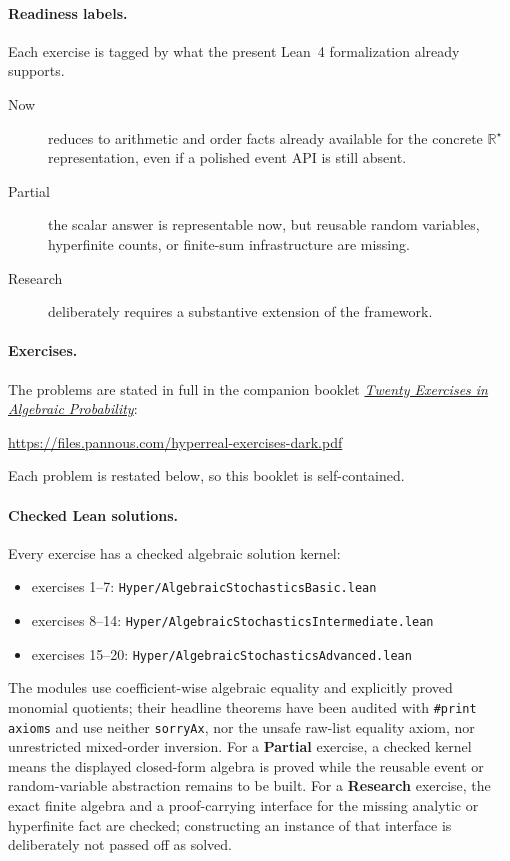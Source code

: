 \documentclass[11pt]{article}
\newcommand{\Rstar}{\mathbb{R}^{\star}}
\begin{document}
\paragraph{Readiness labels.} Each exercise is tagged by what the present
Lean~4 formalization already supports.
\begin{description}
\item[Now] reduces to arithmetic and order facts already available for the
concrete $\Rstar$ representation, even if a polished event API is still absent.
\item[Partial] the scalar answer is representable now, but reusable random
variables, hyperfinite counts, or finite-sum infrastructure are missing.
\item[Research] deliberately requires a substantive extension of the framework.
\end{description}

\paragraph{Exercises.} The problems are stated in full in the companion
booklet \href{https://files.pannous.com/hyperreal-exercises-dark.pdf}{\emph{Twenty Exercises in Algebraic Probability}}:
\begin{center}\small\url{https://files.pannous.com/hyperreal-exercises-dark.pdf}\end{center}
Each problem is restated below, so this booklet is self-contained.

\paragraph{Checked Lean solutions.} Every exercise has a checked algebraic
solution kernel:
\begin{itemize}[nosep, leftmargin=2em]
\item exercises 1--7: \texttt{Hyper/AlgebraicStochasticsBasic.lean}
\item exercises 8--14: \texttt{Hyper/AlgebraicStochasticsIntermediate.lean}
\item exercises 15--20: \texttt{Hyper/AlgebraicStochasticsAdvanced.lean}
\end{itemize}
The modules use coefficient-wise algebraic equality and explicitly proved
monomial quotients; their headline theorems have been audited with
\texttt{\#print axioms} and use neither \texttt{sorryAx}, nor the unsafe
raw-list equality axiom, nor unrestricted mixed-order inversion. For a
\textbf{Partial} exercise, a checked kernel means the displayed closed-form
algebra is proved while the reusable event or random-variable abstraction
remains to be built. For a \textbf{Research} exercise, the exact finite algebra
and a proof-carrying interface for the missing analytic or hyperfinite fact are
checked; constructing an instance of that interface is deliberately not passed
off as solved.
\end{document}
